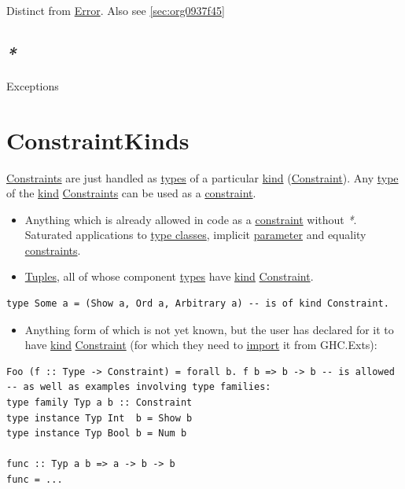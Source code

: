 \documentclass[a4paper,14pt,oneside]{book}
\begin{document}
Distinct from \hyperref[orgee214e4]{Error}. Also see \ref{sec:org0937f45}

\section{\emph{*}}
\label{sec:org2d5fa14}

\label{orgb98341d}Exceptions

\chapter{\label{org3c514de}ConstraintKinds}
\label{sec:org9108f94}
\hyperref[org7c917ef]{Constraints} are just handled as \hyperref[org0ed03e2]{types} of a particular \hyperref[orgdd9b33e]{kind} (\hyperref[org919ab6d]{Constraint}).
Any \hyperref[org39fe653]{type} of the \hyperref[orgdd9b33e]{kind} \hyperref[org7c917ef]{Constraints} can be used as a \hyperref[org919ab6d]{constraint}.
\begin{itemize}
\item Anything which is already allowed in code as a \hyperref[org919ab6d]{constraint} without \emph{*}. Saturated applications to \hyperref[org35f208f]{type classes}, implicit \hyperref[orgfe4afb8]{parameter} and equality \hyperref[org7c917ef]{constraints}.
\item \hyperref[orga22399f]{Tuples}, all of whose component \hyperref[org0ed03e2]{types} have \hyperref[orgdd9b33e]{kind} \hyperref[org919ab6d]{Constraint}.
\end{itemize}
\begin{verbatim}
type Some a = (Show a, Ord a, Arbitrary a) -- is of kind Constraint.
\end{verbatim}
\begin{itemize}
\item Anything form of which is not yet known, but the user has declared for it to have \hyperref[orgdd9b33e]{kind} \hyperref[org919ab6d]{Constraint} (for which they need to \hyperref[org2e0a4fc]{import} it from GHC.Exts):
\end{itemize}
\begin{verbatim}
Foo (f :: Type -> Constraint) = forall b. f b => b -> b -- is allowed
-- as well as examples involving type families:
type family Typ a b :: Constraint
type instance Typ Int  b = Show b
type instance Typ Bool b = Num b

func :: Typ a b => a -> b -> b
func = ...
\end{verbatim}
\end{document}
